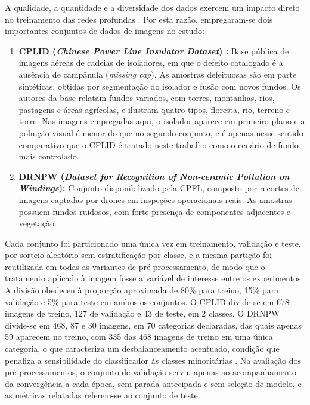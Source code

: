 \documentclass[conference]{IEEEtran}
\begin{document}
A qualidade, a quantidade e a diversidade dos dados exercem um impacto direto no treinamento das redes profundas \cite{shorten2019survey}. Por esta razão, empregaram-se dois importantes conjuntos de dados de imagens no estudo:
\begin{enumerate}
    \item \textbf{CPLID (\textit{Chinese Power Line Insulator Dataset}) \cite{tao2020detection}:} Base pública de imagens aéreas de cadeias de isoladores, em que o defeito catalogado é a ausência de campânula (\textit{missing cap}). As amostras defeituosas são em parte sintéticas, obtidas por segmentação do isolador e fusão com novos fundos. Os autores da base relatam fundos variados, com torres, montanhas, rios, pastagens e áreas agrícolas, e ilustram quatro tipos, floresta, rio, terreno e torre. Nas imagens empregadas aqui, o isolador aparece em primeiro plano e a poluição visual é menor do que no segundo conjunto, e é apenas nesse sentido comparativo que o CPLID é tratado neste trabalho como o cenário de fundo mais controlado.
    \item \textbf{DRNPW (\textit{Dataset for Recognition of Non-ceramic Pollution on Windings}):} Conjunto disponibilizado pela CPFL, composto por recortes de imagens captadas por drones em inspeções operacionais reais. As amostras possuem fundos ruidosos, com forte presença de componentes adjacentes e vegetação.
\end{enumerate}

Cada conjunto foi particionado uma única vez em treinamento, validação e teste, por sorteio aleatório sem estratificação por classe, e a mesma partição foi reutilizada em todas as variantes de pré-processamento, de modo que o tratamento aplicado à imagem fosse a variável de interesse entre os experimentos. A divisão obedeceu à proporção aproximada de 80\% para treino, 15\% para validação e 5\% para teste em ambos os conjuntos. O CPLID divide-se em 678 imagens de treino, 127 de validação e 43 de teste, em 2 classes. O DRNPW divide-se em 468, 87 e 30 imagens, em 70 categorias declaradas, das quais apenas 59 aparecem no treino, com 335 das 468 imagens de treino em uma única categoria, o que caracteriza um desbalanceamento acentuado, condição que penaliza a sensibilidade do classificador às classes minoritárias \cite{he2009learning}. Na avaliação dos pré-processamentos, o conjunto de validação serviu apenas ao acompanhamento da convergência a cada época, sem parada antecipada e sem seleção de modelo, e as métricas relatadas referem-se ao conjunto de teste.
\end{document}
